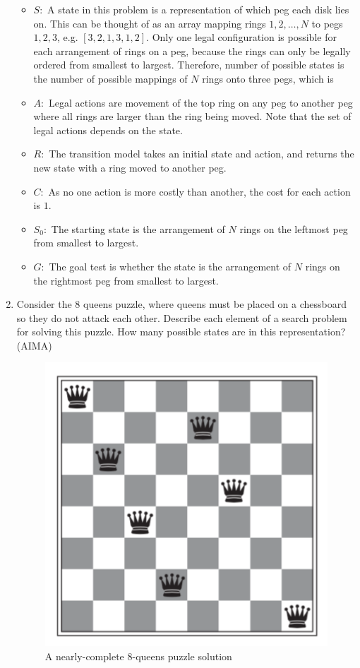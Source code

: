 \documentclass[11pt]{article}
\begin{document}
\begin{enumerate}
\begin{itemize}
\color{blue}
\item $S:$ A state in this problem is a representation of which peg each disk lies on.
This can be thought of as an array mapping rings $1, 2, \dots, N$ to
pegs $1, 2, 3$, e.g. $[3, 2, 1, 3, 1, 2]$. Only one legal configuration is possible
for each arrangement of rings on a peg, because the rings can only be legally
ordered from smallest to largest.
Therefore, number of possible states is the number of possible mappings
of $N$ rings onto three pegs, which is 
\item $A:$ Legal actions are movement of the top ring on any peg to another peg
where all rings are larger than the ring being moved. Note that
the set of legal actions depends on the state.
\item $R:$ The transition model takes an initial state and action, and
returns the new state with a ring moved to another peg.
\item $C:$ As no one action is more costly than another, the cost for each
action is $1$.
\item $S_0:$ The starting state is the arrangement of $N$ rings on the leftmost peg
from smallest to largest.
\item $G:$ The goal test is whether the state is the arrangement of $N$
rings on the rightmost peg from smallest to largest.
\end{itemize}


\newpage
\item
Consider the 8 queens puzzle, where queens must be placed on a
chessboard so they do not attack each other. Describe each element of a
search problem for solving this puzzle. How many possible states are in
this representation? (AIMA)

\begin{figure}[h!t]
  \centering
  \caption{A nearly-complete 8-queens puzzle solution}
  \includegraphics{img/8queens}
\end{figure}


\end{enumerate}
\end{document}
